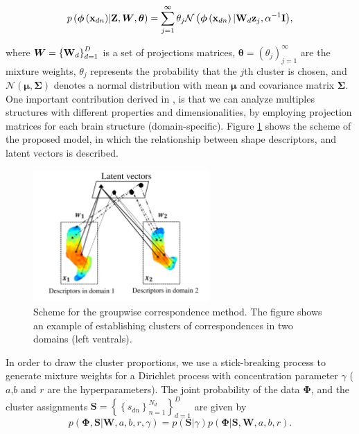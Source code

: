 	\begin{equation}
	p\left( {{\boldsymbol{\phi}\left(\mathbf{x}_{dn}\right)}|{\boldsymbol{\mathrm{Z}}},{\boldsymbol{{W}}},{\boldsymbol{\theta }}} \right) = \sum\limits_{j = 1}^\infty  {{\theta _j}\mathcal{N}\left(\boldsymbol{\phi}\left(\mathbf{x}_{dn}\right)|\mathbf{W}_d\mathbf{z}_j,\alpha^{-1}\mathbf{I}\right)}, 
	\label{eq:llNLmodelf}
	\end{equation}
	
	where $\boldsymbol{{W}} = \left\{\mathbf{W}_d\right\}_{d=1}^{D}$ is a set of projections
	matrices, $\boldsymbol{\theta}=\left(\theta_j\right)_{j=1}^{\infty}$
	are the mixture weights, $\theta_j$ represents the probability that
	the $j$th cluster is chosen, and
	$\mathcal{N}\left(\boldsymbol{\mu},\boldsymbol{\Sigma}\right)$ denotes
	a normal distribution with mean $\boldsymbol{\mu}$ and covariance
	matrix $\boldsymbol{\Sigma}$. One important contribution derived in \cite{Iwata13}, is that we can analyze multiples structures with different properties and dimensionalities, by employing projection matrices for each brain structure (domain-specific). Figure
	\ref{fig:pipelinef} shows the scheme of the proposed model, in which
	the relationship between shape descriptors, and
	latent vectors is described.
	
	\begin{figure}[h!]
		\centering
		\includegraphics[width=0.6\textwidth]{img/pipelineGroupCorr}
		\caption{Scheme for the groupwise correspondence method. The
			figure shows an example of establishing clusters of correspondences
			in two domains (left ventrals).}
		\label{fig:pipelinef}
	\end{figure} 
	
	In order to draw the cluster proportions, we use a stick-breaking process to generate mixture weights for a Dirichlet process with
	concentration parameter $\gamma$ \cite{Iwata13} ($a$,$b$ and $r$ are the hyperparameters). The joint probability
	of the data $\boldsymbol{\Phi}$, and the cluster assignments
	$\mathbf{S}=\left\{\left\{s_{dn}\right\}_{n=1}^{N_{d}}\right\}_{d=1}^{D}$
	are given by
	\begin{equation}
	p\left(\boldsymbol{\Phi},\mathbf{S}|\boldsymbol{{W}},a,b,r,\gamma\right)=
	p\left(\mathbf{S}|\gamma\right)p\left(\boldsymbol{\Phi}|\mathbf{S},\boldsymbol{{W}},a,b,r\right).
	\label{eq:jointPf}
	\end{equation}
	
